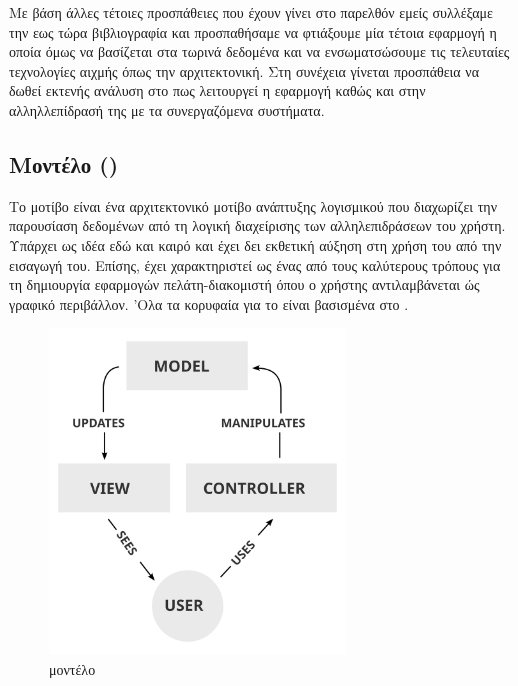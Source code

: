 Με βάση άλλες τέτοιες προσπάθειες που έχουν γίνει στο παρελθόν εμείς συλλέξαμε την εως τώρα βιβλιογραφία
και προσπαθήσαμε να φτιάξουμε μία τέτοια εφαρμογή η οποία όμως να βασίζεται στα τωρινά δεδομένα και να 
ενσωματσώσουμε τις τελευταίες τεχνολογίες αιχμής όπως την  αρχιτεκτονική. Στη συνέχεια γίνεται προσπάθεια να δωθεί εκτενής
ανάλυση στο πως λειτουργεί η εφαρμογή καθώς και στην αλληλλεπίδρασή της με τα συνεργαζόμενα συστήματα. 
 
\subsection{Μοντέλο  ()}

Το μοτίβο  είναι ένα αρχιτεκτονικό μοτίβο ανάπτυξης λογισμικού που διαχωρίζει την παρουσίαση δεδομένων από τη λογική διαχείρισης των αλληλεπιδράσεων του 
χρήστη. Υπάρχει ως ιδέα εδώ και καιρό και έχει δει εκθετική αύξηση στη χρήση του από την εισαγωγή του. 
Επίσης, έχει χαρακτηριστεί ως ένας από τους καλύτερους τρόπους για τη δημιουργία εφαρμογών πελάτη-διακομιστή όπου ο χρήστης αντιλαμβάνεται ώς γραφικό περιβάλλον. 'Ολα τα κορυφαία  
για το  είναι βασισμένα στο . 

\begin{figure}[h]
	\centering
	\includegraphics[width=0.7\textwidth]{graphics/MVC-Process.svg.png}
	\caption{ μοντέλο}
\end{figure}

\subsection{ }

